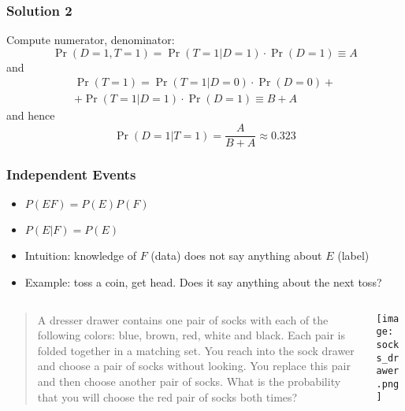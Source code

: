 \documentclass[mathserif, xcolor=table, svgnames]{beamer}
\begin{document}
\begin{frame}
  \frametitle{Solution 2}
  Compute numerator, denominator:
  \begin{equation*}
    \Pr(D=1, T=1) = \Pr(T=1|D=1) \cdot \Pr(D=1) \equiv A
  \end{equation*}
  and
  \begin{multline*}
    \Pr(T=1) = 
    \Pr(T=1|D=0) \cdot \Pr(D=0) +
    \\
    + \Pr(T=1|D=1) \cdot \Pr(D=1) 
    \equiv B + A
  \end{multline*}
  and hence
  \begin{equation*}
    \Pr(D=1|T=1)
    =
    \frac{A}{B + A} \approx 0.323
  \end{equation*}
\end{frame}

\begin{frame}
  \frametitle{Independent Events}
  \begin{itemize}
  \item $P(EF) = P(E)P(F)$
  \item $P(E|F) = P(E)$
  \item Intuition: knowledge of $F$ (data) does not say anything about
    $E$ (label)
  \item Example: toss a coin, get head.  Does it say anything about
    the next toss?
  \end{itemize}
\end{frame}

\begin{frame}
  \begin{columns}
    \begin{column}{0.7\linewidth}
      \begin{quotation}
        A dresser drawer contains one pair of socks with each of the
        following colors: blue, brown, red, white and black. Each pair is
        folded together in a matching set. You reach into the sock drawer
        and choose a pair of socks without looking. You replace this pair
        and then choose another pair of socks. What is the probability
        that you will choose the red pair of socks both times?
      \end{quotation}
    \end{column}
    \begin{column}{0.3\linewidth}
      \texttt{[image: socks\_drawer.png]}
    \end{column}
  \end{columns}
\end{frame}
\end{document}

